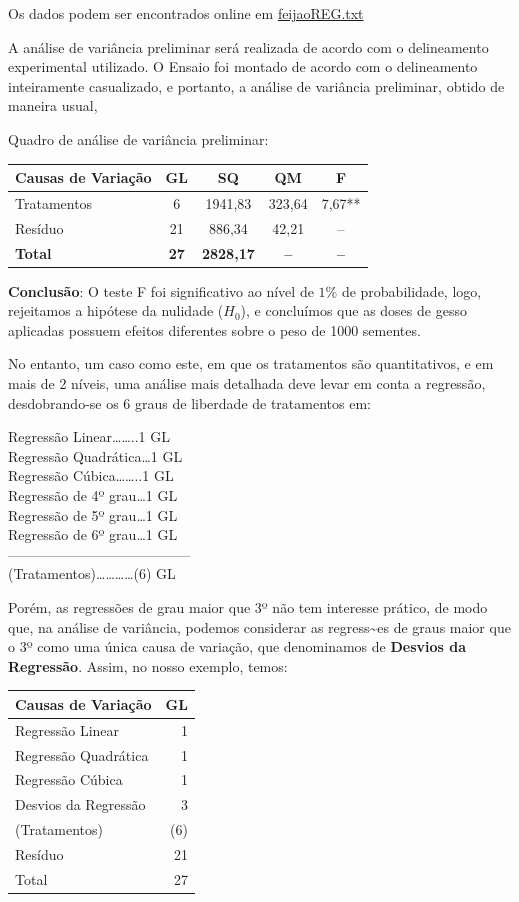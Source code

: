 \documentclass[
]{book}
\begin{document}
Os dados podem ser encontrados online em \href{https://raw.githubusercontent.com/arpanosso/ExpAgr_2020/master/dados/feijaoREG.txt}{feijaoREG.txt}

A análise de variância preliminar será realizada de acordo com o delineamento experimental utilizado. O Ensaio foi montado de acordo com o delineamento inteiramente casualizado, e portanto, a análise de variância preliminar, obtido de maneira usual,

Quadro de análise de variância preliminar:

\begin{longtable}[]{@{}lcccc@{}}
\toprule
Causas de Variação & GL & SQ & QM & F\tabularnewline
\midrule
\endhead
Tratamentos & 6 & 1941,83 & 323,64 & 7,67**\tabularnewline
Resíduo & 21 & 886,34 & 42,21 & --\tabularnewline
\textbf{Total} & \textbf{27} & \textbf{2828,17} & \textbf{--} & \textbf{--}\tabularnewline
\bottomrule
\end{longtable}

\textbf{Conclusão}: O teste F foi significativo ao nível de \(1\%\) de probabilidade, logo, rejeitamos a hipótese da nulidade (\(H_0\)), e concluímos que as doses de gesso aplicadas possuem efeitos diferentes sobre o peso de 1000 sementes.

No entanto, um caso como este, em que os tratamentos são quantitativos, e em mais de 2 níveis, uma análise mais detalhada deve levar em conta a regressão, desdobrando-se os 6 graus de liberdade de tratamentos em:

Regressão Linear\ldots\ldots..1 GL\\
Regressão Quadrática\ldots1 GL\\
Regressão Cúbica\ldots\ldots..1 GL\\
Regressão de 4º grau\ldots1 GL\\
Regressão de 5º grau\ldots1 GL\\
Regressão de 6º grau\ldots1 GL\\
---------------------------------------\\
(Tratamentos)\ldots\ldots\ldots\ldots(6) GL

Porém, as regressões de grau maior que 3º não tem interesse prático, de modo que, na análise de variância, podemos considerar as regress\textasciitilde es de graus maior que o 3º como uma única causa de variação, que denominamos de \textbf{Desvios da Regressão}. Assim, no nosso exemplo, temos:

\begin{longtable}[]{@{}lr@{}}
\toprule
Causas de Variação & GL\tabularnewline
\midrule
\endhead
Regressão Linear & 1\tabularnewline
Regressão Quadrática & 1\tabularnewline
Regressão Cúbica & 1\tabularnewline
Desvios da Regressão & 3\tabularnewline
(Tratamentos) & (6)\tabularnewline
Resíduo & 21\tabularnewline
Total & 27\tabularnewline
\bottomrule
\end{longtable}
\end{document}
